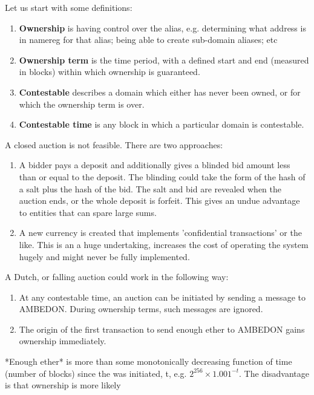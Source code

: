 \documentclass[10pt,a4paper]{article}
\begin{document}
{Let us start with some definitions:

\begin{enumerate}
\item{\bf Ownership} is having control over the alias, e.g. determining what address is in namereg for that alias; being able to create sub-domain aliases; etc
\item{\bf Ownership term} is the time period, with a defined start and end (measured in blocks) within which ownership is guaranteed.
\item{\bf Contestable} describes a domain which either has never been owned, or for which the ownership term is over.
\item{\bf Contestable time} is any block in which a particular domain is contestable.
\end{enumerate}

A closed auction is not feasible. There are two approaches:

\begin{enumerate}
\item A bidder pays a deposit and additionally gives a blinded bid amount less than or equal to the deposit. The blinding could take the form of the hash of a salt plus the hash of the bid. The salt and bid are revealed when the auction ends, or the whole deposit is forfeit. This gives an undue advantage to entities that can spare large sums.
\item A new currency is created that implements 'confidential transactions' or the like. This is an a huge undertaking, increases the cost of operating the system hugely and might never be fully implemented.
\end{enumerate}

A Dutch, or falling auction could work in the following way:

\begin{enumerate}
\item At any contestable time, an auction can be initiated by sending a message to AMBEDON. During ownership terms, such messages are ignored.
\item The origin of the first transaction to send enough ether to AMBEDON gains ownership immediately.
\end{enumerate}

*Enough ether* is more than some monotonically decreasing function of time (number of blocks) since the was initiated, t, e.g. $2^256 \times 1.001^{-t}$. The disadvantage is that ownership is more likely 


}
\end{document}
